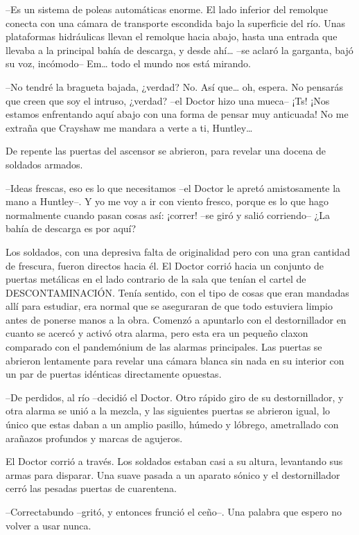 {--Es un sistema de poleas automáticas enorme. El lado inferior del
 remolque conecta con una cámara de transporte escondida bajo la
 superficie del río. Unas plataformas hidráulicas llevan el remolque
 hacia abajo, hasta una entrada que llevaba a la principal bahía de
 descarga, y desde ahí\ldots{} --se aclaró la garganta, bajó su voz,
 incómodo-- Em\ldots{} todo el mundo nos está mirando.}

{--No tendré la bragueta bajada, ¿verdad? No. Así que\ldots{} oh,
 espera. No pensarás que creen que soy el intruso, ¿verdad? --el Doctor
 hizo una mueca-- ¡Ts! ¡Nos estamos enfrentando aquí abajo con una forma
 de pensar muy anticuada! No me extraña que Crayshaw me mandara a verte a
 ti, Huntley\ldots{}}

{De repente las puertas del ascensor se abrieron, para revelar una
docena de soldados armados.}

{--Ideas frescas, eso es lo que necesitamos --el Doctor le apretó
 amistosamente la mano a Huntley--. Y yo me voy a ir con viento fresco,
 porque es lo que hago normalmente cuando pasan cosas así: ¡correr! --se
giró y salió corriendo-- ¿La bahía de descarga es por aquí?}

{Los soldados, con una depresiva falta de originalidad pero con una gran
 cantidad de frescura, fueron directos hacia él. El Doctor corrió hacia
 un conjunto de puertas metálicas en el lado contrario de la sala que
 tenían el cartel de DESCONTAMINACIÓN. Tenía sentido, con el tipo de
 cosas que eran mandadas allí para estudiar, era normal que se aseguraran
 de que todo estuviera limpio antes de ponerse manos a la obra. Comenzó a
 apuntarlo con el destornillador en cuanto se acercó y activó otra
 alarma, pero esta era un pequeño claxon comparado con el pandemónium de
 las alarmas principales. Las puertas se abrieron lentamente para revelar
 una cámara blanca sin nada en su interior con un par de puertas
idénticas directamente opuestas.}

{--De perdidos, al río --decidió el Doctor. Otro rápido giro de su
 destornillador, y otra alarma se unió a la mezcla, y las siguientes
 puertas se abrieron igual, lo único que estas daban a un amplio pasillo,
 húmedo y lóbrego, ametrallado con arañazos profundos y marcas de
agujeros.}

{El Doctor corrió a través. Los soldados estaban casi a su altura,
 levantando sus armas para disparar. Una suave pasada a un aparato sónico
y el destornillador cerró las pesadas puertas de cuarentena.}

{--Correctabundo --gritó, y entonces frunció el ceño--. Una palabra que
espero no volver a usar nunca.}

